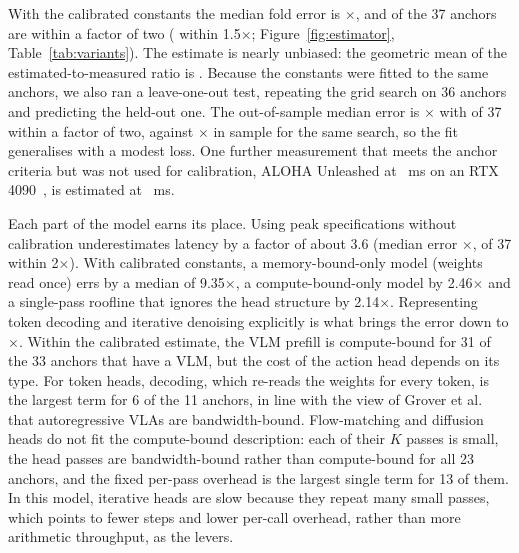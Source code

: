 \documentclass[applsci,review,submit,pdftex,oneauthor]{Definitions/mdpi}
\begin{document}
With the calibrated constants the median fold error is \calMed$\times$, and \calWithinTwo{} of the 37 anchors are within a factor of two (\calWithinOneFive{} within 1.5$\times$; Figure~\ref{fig:estimator}, Table~\ref{tab:variants}). The estimate is nearly unbiased: the geometric mean of the estimated-to-measured ratio is \calBias. Because the constants were fitted to the same anchors, we also ran a leave-one-out test, repeating the grid search on 36 anchors and predicting the held-out one. The out-of-sample median error is \looMed$\times$ with \looWithinTwo{} of 37 within a factor of two, against $\times$ in sample for the same search, so the fit generalises with a modest loss. One further measurement that meets the anchor criteria but was not used for calibration, ALOHA Unleashed at \holdMeas~ms on an RTX 4090~\cite{ax241013126}, is estimated at \holdPred~ms.



Each part of the model earns its place. Using peak specifications without calibration underestimates latency by a factor of about 3.6 (median error \nomMed$\times$, \nomWithinTwo{} of 37 within 2$\times$). With calibrated constants, a memory-bound-only model (weights read once) errs by a median of 9.35$\times$, a compute-bound-only model by 2.46$\times$ and a single-pass roofline that ignores the head structure by 2.14$\times$. Representing token decoding and iterative denoising explicitly is what brings the error down to \calMed$\times$. Within the calibrated estimate, the VLM prefill is compute-bound for 31 of the 33 anchors that have a VLM, but the cost of the action head depends on its type. For token heads, decoding, which re-reads the weights for every token, is the largest term for 6 of the 11 anchors, in line with the view of Grover et al.~\cite{grover2026edge} that autoregressive VLAs are bandwidth-bound. Flow-matching and diffusion heads do not fit the compute-bound description: each of their $K$ passes is small, the head passes are bandwidth-bound rather than compute-bound for all 23 anchors, and the fixed per-pass overhead is the largest single term for 13 of them. In this model, iterative heads are slow because they repeat many small passes, which points to fewer steps and lower per-call overhead, rather than more arithmetic throughput, as the levers.
\end{document}

